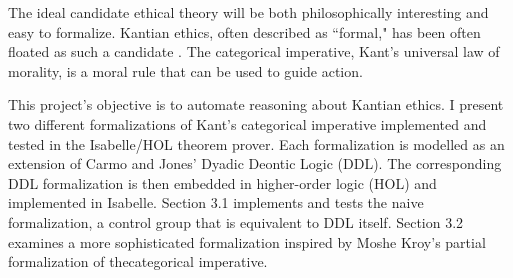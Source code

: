 \begin{isabellebody}
\begin{isamarkuptext}
The ideal candidate ethical theory will be both philosophically interesting and easy to 
formalize. Kantian ethics, often described as ``formal," has been often floated as such a candidate \cite{powers, BL}. 
The categorical imperative, Kant's universal law of morality, is a moral rule that can be used to 
guide action. 

This project's objective is to automate reasoning about Kantian ethics. I present two different
formalizations of Kant's categorical imperative implemented and tested in the Isabelle/HOL \cite{isabelle} theorem prover.
Each formalization is modelled as an extension of Carmo and Jones' Dyadic Deontic Logic (DDL). The corresponding 
DDL formalization is then embedded in higher-order logic (HOL) and implemented in Isabelle. Section 
3.1 implements and tests the naive formalization, a control group that is equivalent to DDL 
itself. Section 3.2 examines a more sophisticated formalization inspired by Moshe Kroy's partial 
formalization of thecategorical imperative. 


\end{isamarkuptext}
\end{isabellebody}
